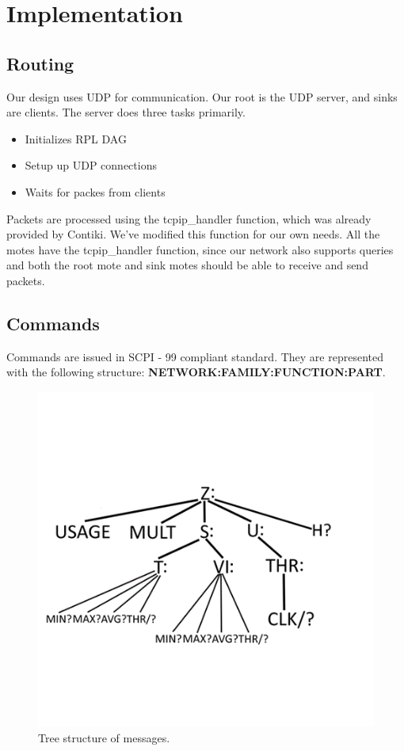 \documentclass[a4paper]{article}
\begin{document}
\section{Implementation}
\subsection{Routing}
Our design uses UDP for communication. Our root is the UDP server, and sinks are clients. The server does three tasks primarily.

\begin{itemize}
\item Initializes RPL DAG
\item Setup up UDP connections
\item Waits for packes from clients 
\end{itemize}

Packets are processed using the tcpip\_handler function, which was already provided by Contiki. We've modified this function for our own needs. All the motes have the tcpip\_handler function, since our network also supports queries and both the root mote and sink motes should be able to receive and send packets.

\subsection{Commands}
Commands are issued in SCPI - 99 compliant standard. They are represented with the following structure: \textbf{NETWORK:FAMILY:FUNCTION:PART}.
\begin{figure}[!htb]
    \begin{center}
        \includegraphics[scale=0.8]{structure.png}
        \caption{Tree structure of messages.} \label{pic1}
    \end{center}
\end{figure}
\end{document}
